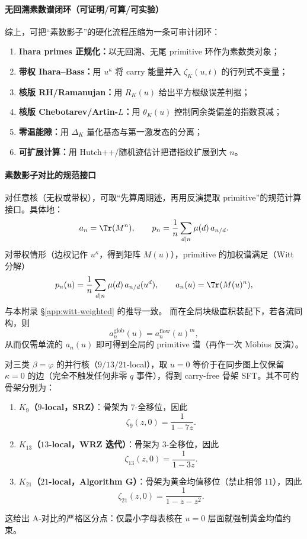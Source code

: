 \paragraph{无回溯素数谱闭环（可证明/可算/可实验）}
综上，可把“素数影子”的硬化流程压缩为一条可审计闭环：
\begin{enumerate}
  \item \textbf{Ihara primes 正规化：}以无回溯、无尾 primitive 环作为素数类对象；
  \item \textbf{带权 Ihara--Bass：}用 $u^{\kappa}$ 将 carry 能量并入 $\zeta_K(u,t)$ 的行列式不变量；
  \item \textbf{核版 RH/Ramanujan：}用 $R_K(u)$ 给出平方根级误差判据；
  \item \textbf{核版 Chebotarev/Artin-$L$：}用 $\theta_K(u)$ 控制同余类偏差的指数衰减；
  \item \textbf{零温能隙：}用 $\Delta_K$ 量化基态与第一激发态的分离；
  \item \textbf{可扩展计算：}用 Hutch++/随机迹估计把谱指纹扩展到大 $n$。
\end{enumerate}

\paragraph{素数影子对比的规范接口}
对任意核（无权或带权），可取“先算周期迹，再用反演提取 primitive”的规范计算接口。具体地：
\[
a_n=\Tr(M^n),\qquad
p_n=\frac{1}{n}\sum_{d\mid n}\mu(d)\,a_{n/d}.
\]
对带权情形（边权记作 $u^{\kappa}$，得到矩阵 $M(u)$），primitive 的加权谱满足（Witt 分解）
\[
p_n(u)=\frac{1}{n}\sum_{d\mid n}\mu(d)\,a_{n/d}(u^d),
\qquad a_n(u)=\Tr(M(u)^n),
\]
与本附录 \S\ref{app:witt-weighted} 的推导一致。
而在全局块级直积装配下，若各流同构，则
\[
a_n^{\mathrm{glob}}(u)=a_n^{\mathrm{flow}}(u)^m,
\]
从而仅需单流的 $a_n(u)$ 即可得到全局的 primitive 谱（再作一次 Möbius 反演）。

\begin{proposition}\label{prop:carry-free-skeleton-three}
对三类 $\beta=\varphi$ 的并行核（$9/13/21$-local），取 $u=0$ 等价于在同步图上仅保留 $\kappa=0$ 的边（完全不触发任何非零 $q$ 事件），得到 carry-free 骨架 SFT。其不可约骨架分别为：
\begin{enumerate}
  \item \textbf{$K_9$（$9$-local，SRZ）}：骨架为 $7$-全移位，因此
  \[
  \zeta_{9}(z,0)=\frac{1}{1-7z}.
  \]
  \item \textbf{$K_{13}$（$13$-local，WRZ 迭代）}：骨架为 $3$-全移位，因此
  \[
  \zeta_{13}(z,0)=\frac{1}{1-3z}.
  \]
  \item \textbf{$K_{21}$（$21$-local，Algorithm G）}：骨架为黄金均值移位（禁止相邻 $11$），因此
  \[
  \zeta_{21}(z,0)=\frac{1}{1-z-z^2}.
  \]
\end{enumerate}
这给出 A-对比的严格区分点：仅最小字母表核在 $u=0$ 层面就强制黄金均值约束。
\end{proposition}

